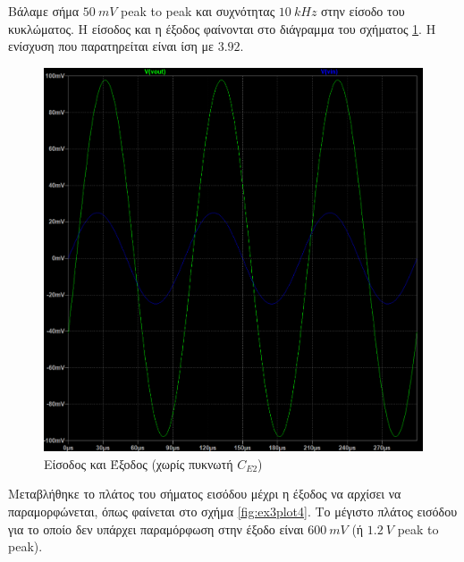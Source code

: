\documentclass[11pt,a4paper,twoside,onecolumn,openright,final]{memoir}
\begin{document}
Βάλαμε σήμα \(50 \ mV\) peak to peak και συχνότητας \(10 \ kHz\) στην είσοδο του κυκλώματος. Η είσοδος και η έξοδος φαίνονται στο διάγραμμα του σχήματος \ref{fig:ex3plot3}. Η ενίσχυση που παρατηρείται είναι ίση με \(3.92\).

\begin{figure}[H]
\centerfloat%
\includegraphics[width=12.0cm]{figures/exercise3_1transient.png}
\caption{Είσοδος και Έξοδος (χωρίς πυκνωτή \(C_{E2}\))}\label{fig:ex3plot3}
\end{figure}

Μεταβλήθηκε το πλάτος του σήματος εισόδου μέχρι η έξοδος να αρχίσει να παραμορφώνεται, όπως φαίνεται στο σχήμα \ref{fig:ex3plot4}. Το μέγιστο πλάτος εισόδου για το οποίο δεν υπάρχει παραμόρφωση στην έξοδο είναι \(600 \ mV\) (ή \(1.2 \ V\) peak to peak).
\end{document}
